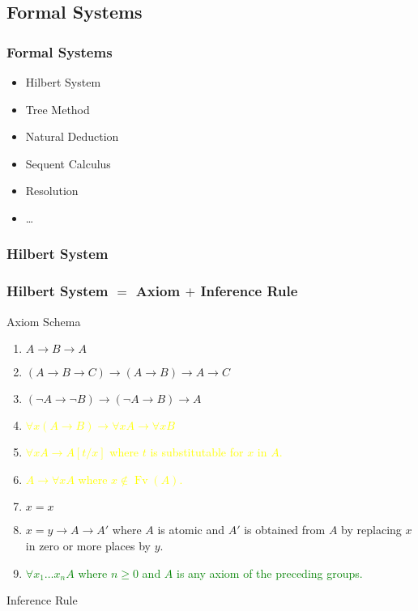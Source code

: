 \documentclass[UTF8,aspectratio=43,11pt,colorlinks,compress,openany]{beamer}%
\begin{document}
\subsection{Formal Systems}

\begin{frame}\frametitle{Formal Systems}
	\begin{itemize}
		\item Hilbert System
		\item Tree Method
		\item Natural Deduction
		\item Sequent Calculus
		\item Resolution
		\item \dots
	\end{itemize}
\end{frame}

\subsubsection{Hilbert System}

\begin{frame}\frametitle{Hilbert System $=$ Axiom $+$ Inference Rule}\vspace{-1ex}
				\begin{block}{Axiom Schema}
					\begin{enumerate}
						\item $A\to B\to A$
						\item $(A\to B\to C)\to(A\to B)\to A\to C$
						\item $(\neg A\to\neg B)\to(\neg A\to B)\to A$
						\item \textcolor{yellow}{$\forall x(A\to B)\to\forall x A\to\forall x B$}
						\item \textcolor{yellow}{$\forall x A\to A[t/x]$ where $t$ is substitutable for $x$ in $A$.}
						\item \textcolor{yellow}{$A\to\forall x A$ where $x\notin \operatorname{Fv}(A)$.}
						\item $x=x$
						\item $x=y\to A\to A'$ where $A$ is atomic and $A'$ is obtained from $A$ by replacing $x$ in zero or more places by $y$.
						\item \textcolor{green}{$\forall x_1\dots x_n A$ where $n\geq 0$ and $A$ is any axiom of the preceding groups.}
					\end{enumerate}
				\end{block}
				\begin{block}{Inference Rule}
					\begin{prooftree}
						\alwaysSingleLine
						\RightLabel{\textcolor{yellow}{[MP]}}
					\end{prooftree}
				\end{block}
\end{frame}
\end{document}
